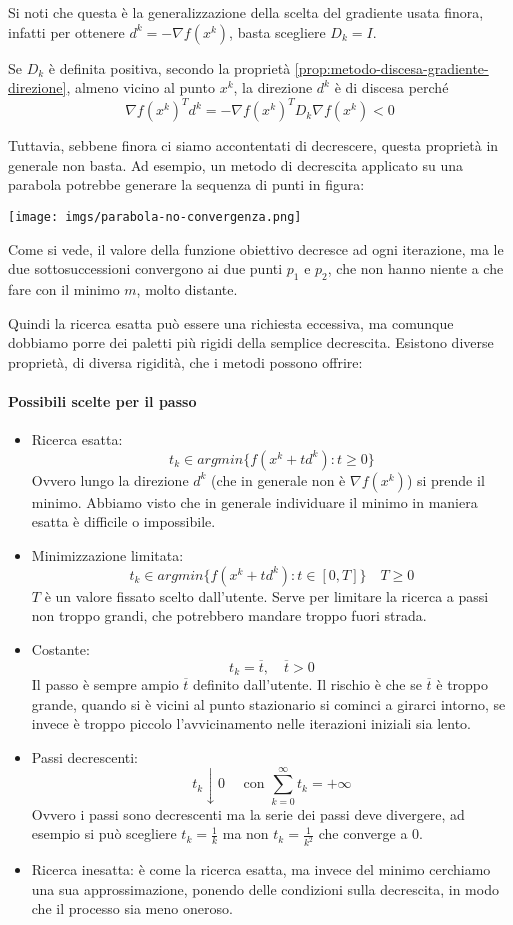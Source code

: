 Si noti che questa \`e la generalizzazione della scelta del gradiente
usata finora, infatti per ottenere $d^{k} = -\nabla f(x^{k})$,
basta scegliere $D_k = I$.

Se $D_k$ \`e definita positiva, secondo la propriet\`a
\ref{prop:metodo-discesa-gradiente-direzione}, almeno vicino al punto
$x^k$, la direzione $d^k$ \`e di discesa perch\'e
    $$ \nabla f(x^{k})^{T} d^{k} = - \nabla f(x^{k})^{T} D_k \nabla f(x^{k})< 0$$

Tuttavia, sebbene finora ci siamo accontentati di decrescere, questa
propriet\`a in generale non basta. Ad esempio, un metodo di decrescita
applicato su una parabola potrebbe generare la sequenza di punti in
figura:

\centerline{\texttt{[image: imgs/parabola-no-convergenza.png]}}

Come si vede, il valore della funzione obiettivo decresce ad ogni
iterazione, ma le due sottosuccessioni convergono ai due punti $p_1$ e
$p_2$, che non hanno niente a che fare con il minimo $m$, molto
distante.

Quindi la ricerca esatta può essere una richiesta eccessiva, ma
comunque dobbiamo porre dei paletti pi\`u rigidi della semplice
decrescita. Esistono diverse propriet\`a, di diversa rigidit\`a, che i
metodi possono offrire:
\paragraph{Possibili scelte per il passo}
\begin{itemize}
\item Ricerca esatta: $$ t_k \in argmin \{ f (x^{k} + td^{k}) : t \geq
0 \}$$ Ovvero lungo la direzione $d^k$ (che in generale non \`e $\nabla
f(x^k)$) si prende il minimo. Abbiamo visto che in generale
individuare il minimo in maniera esatta \`e difficile o impossibile.
\item Minimizzazione limitata: $$ t_k \in argmin \{ f (x^{k} + td^{k})
: t \in [0,T]\} \quad T \geq 0 $$ $T$ \`e un valore fissato scelto
dall'utente. Serve per limitare la ricerca a passi non troppo grandi,
che potrebbero mandare troppo fuori strada.
\item Costante: $$t_k = \overline{t}, \quad \overline{t}> 0$$ Il passo
\`e sempre ampio $\overline{t}$ definito dall'utente. Il rischio \`e che
se $\overline{t}$ \`e troppo grande, quando si \`e vicini al punto
stazionario si cominci a girarci intorno, se invece \`e troppo piccolo
l'avvicinamento nelle iterazioni iniziali sia lento.
\item Passi decrescenti: $$ t_{k} \downarrow 0 \quad\text{ con }
\sum_{k=0}^{\infty} t_k = + \infty$$ Ovvero i passi sono decrescenti
ma la serie dei passi deve divergere, ad esempio si può scegliere
$t_{k} = \frac{1}{k}$ ma non $t_{k} = \frac{1}{k^2}$ che converge a
$0$.
\item Ricerca inesatta: \`e come la ricerca esatta, ma invece del minimo
cerchiamo una sua approssimazione, ponendo delle condizioni sulla
decrescita, in modo che il processo sia meno oneroso.
\end{itemize}

